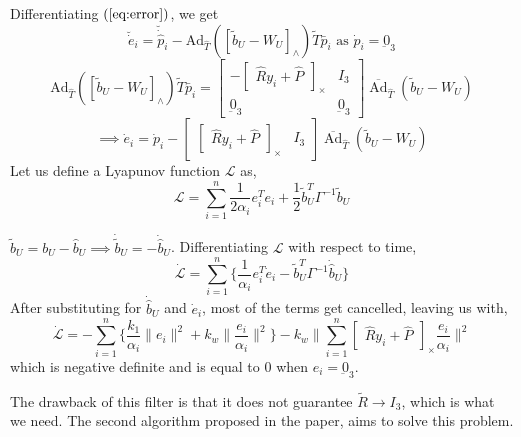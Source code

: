 \documentclass[12pt]{article}
\def\omani#1{\breve{#1}}
\def\vecAdthat{\overline{\operatorname{Ad}}_{\hat{{T}}}\left(\tilde{b}_{U}-W_{U}\right)}
\def\cross#1{\begin{bmatrix} #1 \end{bmatrix}_\times}
\begin{document}
Differentiating $(\ref{eq:error})$, we get 
\begin{equation}
    \omani {\dot e}_i = \omani {\dot{\hat{p}}}_i - \text{Ad}_{\hat T}([\tilde b_U -W_U]_\wedge )\tilde T \bar p_i \text{ as } \dot p_i = \underbar{0}_3
\end{equation}
\begin{equation}
    \text{Ad}_{\hat T}([\tilde b_U -W_U]_\wedge )\tilde T \bar p_i  = 
    \begin{bmatrix}
        -\begin{bmatrix}
            \hat R y_i + \hat P
        \end{bmatrix}_\times & I_3 \\
        \underbar{0}_3 & \underbar{0}_3
    \end{bmatrix}
    \vecAdthat
\end{equation}
\begin{equation}
    \implies \dot e_i = \dot p_i - \begin{bmatrix}
        \cross{\hat Ry_i + \hat {P}} & I_3
    \end{bmatrix}\vecAdthat
\end{equation} 
Let us define a Lyapunov function $\mathcal{L}$ as, 
\begin{equation}
    \mathcal{L} = \sum_{i=1}^{n} \frac{1}{2 \alpha_i} e_i^Te_i + \frac{1}{2}\tilde{b}_U^T \Gamma^{-1}\tilde{b}_U
\end{equation}

$\tilde b_U = b_U - \hat b_U \implies \dot{\tilde{b}}_U = -\dot{\hat b}_U$. Differentiating $\mathcal{L}$ with respect to time,
\begin{equation}
    \dot{\mathcal{L}} = \sum_{i=1}^{n} \{  \frac{1}{\alpha_i} e_i^T \dot e_i - \tilde{b}_U^T \Gamma^{-1}\dot{\hat{b}}_U \} 
\end{equation}
After substituting for $\dot{\hat b}_U$ and $\dot e_i$, most of the terms get cancelled, leaving us with,
\begin{equation}
    \dot{\mathcal{L}} = -\sum_{i=1}^{n} \{\frac{k_1}{\alpha_i} \|e_i \|^2 + k_w \|\frac{e_i}{\alpha_i} \|^2 \} -k_w \| \sum_{i=1}^{n} \cross{\hat R y_i + \hat P} \frac{e_i}{\alpha_i} \|^2
\end{equation}
which is negative definite and is equal to 0 when $e_i = \underbar{0}_3$.

The drawback of this filter is that it does not guarantee $\tilde{R} \rightarrow I_3$, which is 
what we need. The second algorithm proposed in the paper, aims to solve this problem.
\end{document}
